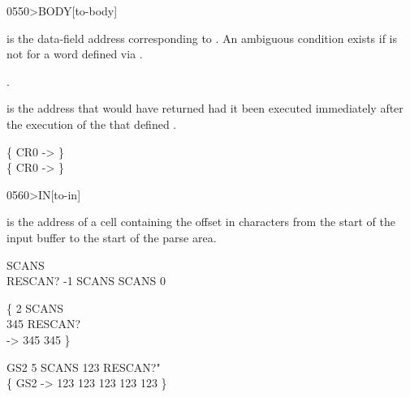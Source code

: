\begin{worddef}[toBODY]{0550}{>BODY}[to-body]
\item {}

	 is the data-field address corresponding to
	. An ambiguous condition exists if  is not
	for a word defined via .

\see {}.

	\begin{defer}
	\rationale %
		 is the address that  would have
		returned had it been executed immediately after the execution
		of the  that defined .

	\testing
		\{  CR0 -> \} \\
		\{  CR0  ->  \}
	\end{defer}
\end{worddef}


\begin{worddef}[toIN]{0560}{>IN}[to-in]
\item {}

	 is the address of a cell containing the offset in
	characters from the start of the input buffer to the start of
	the parse area.

	\begin{defer}
	\testing
		 SCANS \\
		\word{:} RESCAN?  -1 SCANS \word{+!} SCANS   0  \word{!}  \word{;}

		\{ 2 SCANS \word{!} \\
		345 RESCAN? \\
		-> 345 345 \}

		\word{:} GS2  5 SCANS \word{!}  123 RESCAN?"  \word{;} \\
		\{ GS2 -> 123 123 123 123 123 \}
	\end{defer}
\end{worddef}



